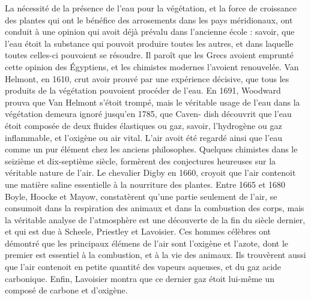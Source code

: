 La nécessité de la présence de l'eau pour la végétation, et la force de croissance des plantes qui ont le bénéfice des arrosements dans les pays méridionaux, ont conduit à une opinion qui avoit déjà prévalu dans l'ancienne école : savoir, que l'eau étoit la substance qui pouvoit produire toutes les autres, et dans laquelle toutes celles-ci pouvoient se résoudre. Il paroît que les Grecs avoient emprunté cette opinion des Égyptiens, et les chimistes modernes l'avoient renouvelée. Van Helmont, en 1610, crut avoir prouvé par une expérience décisive, que tous les produits de la végétation pouvoient procéder de l'eau. En 1691, Woodward prouva que Van Helmont s'étoit trompé, mais le véritable usage de l'eau dans la végétation demeura ignoré jusqu'en 1785, que Caven-\setcounter{page}{340} dish découvrit que l'eau étoit composée de deux fluides élastiques ou gaz, savoir, l'hydrogène ou gaz inflammable, et l'oxigène ou air vital.
L'air avoit été regardé ainsi que l'eau comme un pur élément chez les anciens philosophes. Quelques chimistes dans le seizième et dix-septième siècle, formèrent des conjectures heureuses sur la véritable nature de l'air. Le chevalier Digby en 1660, croyoit que l'air contenoit une matière saline essentielle à la nourriture des plantes. Entre 1665 et 1680 Boyle, Hoocke et Mayow, constatèrent qu'une partie seulement de l'air, se consumoit dans la respiration des animaux et dans la combustion des corps, mais la véritable analyse de l'atmosphère est une découverte de la fin du siècle dernier, et qui est due à Scheele, Priestley et Lavoisier. Ces hommes célèbres ont démontré que les principaux élémens de l'air sont l'oxigène et l'azote, dont le premier est essentiel à la combustion, et à la vie des animaux. Ils trouvèrent aussi que l'air contenoit en petite quantité des vapeurs aqueuses, et du gaz acide carbonique. Enfin, Lavoisier montra que ce dernier gaz étoit lui-même un composé de carbone et d'oxigène.
